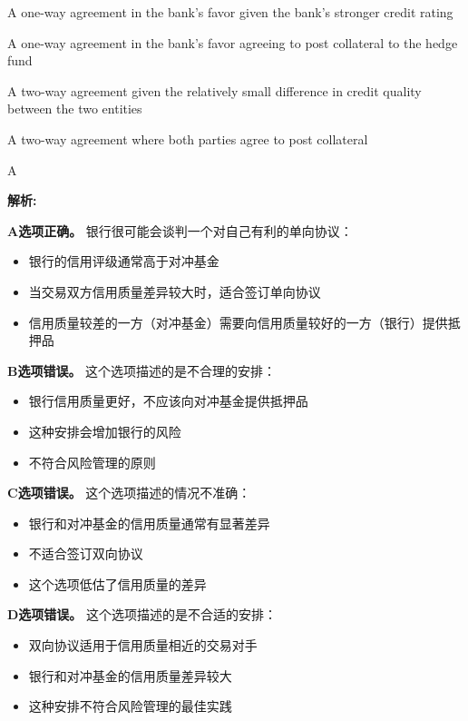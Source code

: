 \documentclass{article}
\newenvironment{explanation}
{\textbf{解析:}\par}
{\par}
\begin{document}
\begin{choices}
    \item A one-way agreement in the bank's favor given the bank's stronger credit rating
    \item A one-way agreement in the bank's favor agreeing to post collateral to the hedge fund
    \item A two-way agreement given the relatively small difference in credit quality between the two entities
    \item A two-way agreement where both parties agree to post collateral
\end{choices}

\begin{correctanswer}
    A
\end{correctanswer}

\begin{explanation}
    \textbf{A选项正确。}
    银行很可能会谈判一个对自己有利的单向协议：
    \begin{itemize}
        \item 银行的信用评级通常高于对冲基金
        \item 当交易双方信用质量差异较大时，适合签订单向协议
        \item 信用质量较差的一方（对冲基金）需要向信用质量较好的一方（银行）提供抵押品
    \end{itemize}

    \textbf{B选项错误。}
    这个选项描述的是不合理的安排：
    \begin{itemize}
        \item 银行信用质量更好，不应该向对冲基金提供抵押品
        \item 这种安排会增加银行的风险
        \item 不符合风险管理的原则
    \end{itemize}

    \textbf{C选项错误。}
    这个选项描述的情况不准确：
    \begin{itemize}
        \item 银行和对冲基金的信用质量通常有显著差异
        \item 不适合签订双向协议
        \item 这个选项低估了信用质量的差异
    \end{itemize}

    \textbf{D选项错误。}
    这个选项描述的是不合适的安排：
    \begin{itemize}
        \item 双向协议适用于信用质量相近的交易对手
        \item 银行和对冲基金的信用质量差异较大
        \item 这种安排不符合风险管理的最佳实践
    \end{itemize}
\end{explanation}
\end{document}

